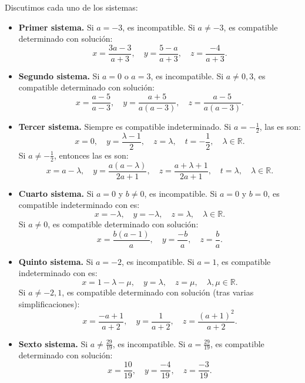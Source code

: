 \begin{ejercicio}
	Discutimos cada uno de los sistemas:

	\begin{itemize}
		\item \textbf{Primer sistema.} Si $a = -3$, es incompatible. Si $a \neq -3$, es compatible determinado con solución:
		      \[
			      x = \frac{3a - 3}{a + 3}, \quad y = \frac{5 - a}{a + 3}, \quad z = \frac{-4}{a + 3}.
		      \]

		\item \textbf{Segundo sistema.} Si $a = 0$ o $a = 3$, es incompatible. Si $a \neq 0, 3$, es compatible determinado con solución:
		      \[
			      x = \frac{a - 5}{a - 3}, \quad y = \frac{a + 5}{a(a - 3)}, \quad z = \frac{a - 5}{a(a - 3)}.
		      \]

		\item \textbf{Tercer sistema.} Siempre es compatible indeterminado. Si $a = -\frac{1}{2}$, las es son:
		      \[
			      x = 0, \quad y = \frac{\lambda - 1}{2}, \quad z = \lambda, \quad t = -\frac{1}{2}, \quad \lambda \in \mathbb{R}.
		      \]
		      Si $a \neq -\frac{1}{2}$, entonces las es son:
		      \[
			      x = a - \lambda, \quad y = \frac{a(a - \lambda)}{2a + 1}, \quad z = \frac{a + \lambda + 1}{2a + 1}, \quad t = \lambda, \quad \lambda \in \mathbb{R}.
		      \]

		\item \textbf{Cuarto sistema.} Si $a = 0$ y $b \neq 0$, es incompatible. Si $a = 0$ y $b = 0$, es compatible indeterminado con es:
		      \[
			      x = -\lambda, \quad y = -\lambda, \quad z = \lambda, \quad \lambda \in \mathbb{R}.
		      \]
		      Si $a \neq 0$, es compatible determinado con solución:
		      \[
			      x = \frac{b(a - 1)}{a}, \quad y = \frac{-b}{a}, \quad z = \frac{b}{a}.
		      \]

		\item \textbf{Quinto sistema.} Si $a = -2$, es incompatible. Si $a = 1$, es compatible indeterminado con es:
		      \[
			      x = 1 - \lambda - \mu, \quad y = \lambda, \quad z = \mu, \quad \lambda, \mu \in \mathbb{R}.
		      \]
		      Si $a \neq -2, 1$, es compatible determinado con solución (tras varias simplificaciones):
		      \[
			      x = \frac{-a + 1}{a + 2}, \quad y = \frac{1}{a + 2}, \quad z = \frac{(a + 1)^2}{a + 2}.
		      \]

		\item \textbf{Sexto sistema.} Si $a \neq \frac{29}{19}$, es incompatible. Si $a = \frac{29}{19}$, es compatible determinado con solución:
		      \[
			      x = \frac{10}{19}, \quad y = \frac{-4}{19}, \quad z = \frac{-3}{19}.
		      \]


\end{itemize}
\end{ejercicio}
